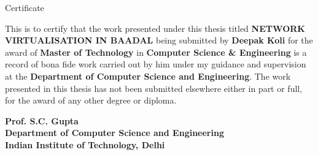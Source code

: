 \begin{center}
\LARGE{ Certificate} 
\end{center}

\vspace{0.5in}

This is to certify that the work presented under this thesis titled {\bfseries NETWORK VIRTUALISATION IN BAADAL} being submitted by
{\bfseries Deepak Koli} for the award of {\bfseries Master of Technology} in {\bfseries Computer Science \& Engineering} is a record of bona fide work carried out by him under my guidance and supervision at the {\bfseries Department of Computer Science and Engineering}. The work presented in this thesis has not been submitted elsewhere either in part or full, for the award of any other degree or diploma.

\vspace{1.5in}


{\bfseries Prof. S.C. Gupta} \\
{\bfseries Department of Computer Science and Engineering} \\
{\bfseries Indian Institute of Technology, Delhi}\\ 
